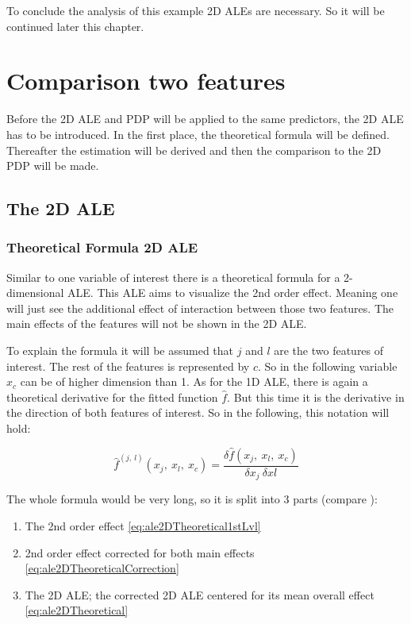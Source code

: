 \documentclass[]{krantz}
\begin{document}
To conclude the analysis of this example 2D ALEs are necessary. So it
will be continued later this chapter.

\section{Comparison two features}\label{comparison-two-features}

Before the 2D ALE and PDP will be applied to the same predictors, the 2D
ALE has to be introduced. In the first place, the theoretical formula
will be defined. Thereafter the estimation will be derived and then the
comparison to the 2D PDP will be made.

\subsection{The 2D ALE}\label{the-2d-ale}

\subsubsection{Theoretical Formula 2D
ALE}\label{theoretical-formula-2d-ale}

Similar to one variable of interest there is a theoretical formula for a
2-dimensional ALE. This ALE aims to visualize the 2nd order effect.
Meaning one will just see the additional effect of interaction between
those two features. The main effects of the features will not be shown
in the 2D ALE.

To explain the formula it will be assumed that \(j\) and \(l\) are the
two features of interest. The rest of the features is represented by
\(c\). So in the following variable \(x_c\) can be of higher dimension
than 1. As for the 1D ALE, there is again a theoretical derivative for
the fitted function \(\hat{f}\). But this time it is the derivative in
the direction of both features of interest. So in the following, this
notation will hold:

\[ \hat{f}^{(j,~l)}(x_j,~x_l,~x_c) = \frac{\delta\hat{f}(x_j,~x_l,~x_c)}{\delta x_j~ \delta xl}\]

The whole formula would be very long, so it is split into 3 parts
(compare \citep[page 8]{Apley2016}):

\begin{enumerate}
\def\labelenumi{\arabic{enumi}.}
\item
  The 2nd order effect \eqref{eq:ale2DTheoretical1stLvl}
\item
  2nd order effect corrected for both main effects
  \eqref{eq:ale2DTheoreticalCorrection}
\item
  The 2D ALE; the corrected 2D ALE centered for its mean overall effect
  \eqref{eq:ale2DTheoretical}
\end{enumerate}
\end{document}
